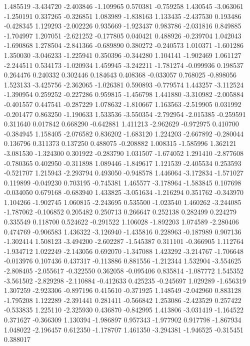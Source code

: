 1.485519
-3.434720
-2.403846
-1.109965
0.570381
-0.759258
1.430545
-3.063061
-1.250191
0.337265
-0.326851
1.083989
-1.838163
1.133435
-2.437530
0.193486
-0.428345
1.129293
-2.002226
0.935669
-1.923437
0.983786
-2.031816
0.849885
-1.704997
1.207051
-2.621252
-0.177805
0.040421
0.488926
-0.239704
1.042043
-1.690868
1.278504
-2.841366
-0.689890
0.380272
-0.240573
1.010371
-1.601286
1.350030
-3.046233
-1.225941
0.350396
-0.344280
1.104141
-1.902469
1.061127
-2.244511
0.534173
-1.020934
1.459945
-3.242211
-1.781274
-0.099936
0.198537
0.264476
0.240332
0.302446
0.184643
0.408368
-0.033057
0.768025
-0.898056
1.523133
-3.425756
-2.362065
-1.026381
0.590893
-0.779574
1.443257
-3.112524
-1.390954
0.259252
-0.227286
0.959815
-1.456798
1.441880
-3.310982
-2.005884
-0.401557
0.447541
-0.287229
1.078632
-1.810667
1.163563
-2.519905
0.031992
-0.201477
0.863250
-1.190633
1.533536
-3.550354
-2.792954
-2.015385
-0.259591
0.311640
0.017842
0.668290
-0.642881
1.411213
-2.962629
-0.972975
0.410700
-0.384945
1.158405
-2.076582
0.836202
-1.683120
1.224203
-2.667892
-0.280044
0.136796
0.311373
0.137250
0.488075
-0.208882
1.008315
-1.585996
1.362121
-3.081530
-1.324300
0.301922
-0.283790
1.031507
-1.674052
1.291410
-2.877608
-0.780365
0.402950
-0.311898
1.089446
-1.849617
1.121539
-2.405534
0.253593
-0.521707
1.215943
-2.293794
0.493050
-0.948578
1.446064
-3.172834
-1.571027
0.119899
-0.049230
0.703195
-0.745381
1.465577
-3.178964
-1.583845
0.107698
-0.034050
0.679168
-0.683940
1.433825
-3.051634
-1.216294
0.351762
-0.343970
1.104266
-1.902745
1.060815
-2.243695
0.535500
-1.023540
1.460262
-3.244085
-1.787062
-0.106852
0.205482
0.250713
0.266647
0.252138
0.282499
0.224279
0.335549
0.118700
0.524622
-0.291522
1.106028
-1.892203
1.074589
-2.280406
0.474769
-0.906583
1.436322
-3.126940
-1.435816
0.228963
-0.187989
0.907136
-1.302414
1.508123
-3.494200
-2.602287
-1.545387
0.311101
-0.366905
1.112764
-1.934712
1.022249
-2.143056
0.692070
-1.347088
1.423292
-3.214767
-1.706648
-0.013976
0.107436
0.437317
-0.113886
0.881556
-1.212344
1.532904
-3.554625
-2.808405
-2.055617
-0.322550
0.362058
-0.095406
0.835814
-1.087772
1.545352
-3.561502
-2.829298
-2.110884
-0.412633
0.425235
-0.245697
1.029289
-1.656319
1.307259
-2.923306
-0.897196
0.415610
-0.371925
1.148549
-2.042960
0.883128
-1.795208
1.122289
-2.391441
0.281411
-0.566842
1.253086
-2.423529
0.257422
-0.533835
1.225110
-2.325930
0.436870
-0.842995
1.413806
-3.031419
-1.164522
0.371627
-0.366309
1.130394
-1.986897
0.957343
-1.977902
0.917798
-1.867934
1.048022
-2.196457
0.612350
-1.178707
1.461350
-3.294381
-1.946525
-0.315451
0.388017
